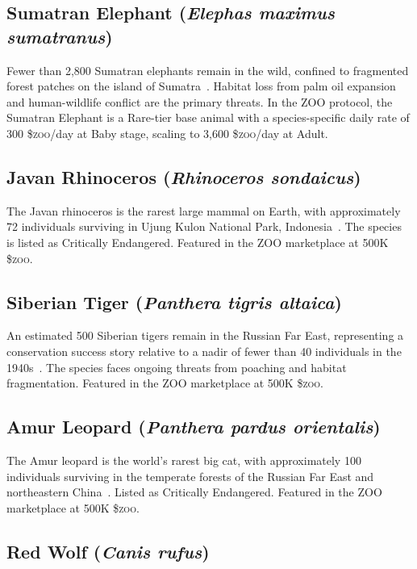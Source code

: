 \documentclass[11pt,letterpaper]{article}
\newcommand{\ZOO}{\$\textsc{zoo}}
\begin{document}
\subsection{Sumatran Elephant (\textit{Elephas maximus sumatranus})}

Fewer than 2,800 Sumatran elephants remain in the wild, confined to fragmented forest
patches on the island of Sumatra~\cite{iucn2021}.  Habitat loss from palm oil expansion
and human-wildlife conflict are the primary threats.  In the ZOO protocol, the Sumatran
Elephant is a Rare-tier base animal with a species-specific daily rate of 300 \ZOO{}/day
at Baby stage, scaling to 3,600 \ZOO{}/day at Adult.

\subsection{Javan Rhinoceros (\textit{Rhinoceros sondaicus})}

The Javan rhinoceros is the rarest large mammal on Earth, with approximately 72 individuals
surviving in Ujung Kulon National Park, Indonesia~\cite{irf2021}.  The species is listed as
Critically Endangered.  Featured in the ZOO marketplace at 500K \ZOO{}.

\subsection{Siberian Tiger (\textit{Panthera tigris altaica})}

An estimated 500 Siberian tigers remain in the Russian Far East, representing a
conservation success story relative to a nadir of fewer than 40 individuals in the
1940s~\cite{panthera2021}.  The species faces ongoing threats from poaching and habitat
fragmentation.  Featured in the ZOO marketplace at 500K \ZOO{}.

\subsection{Amur Leopard (\textit{Panthera pardus orientalis})}

The Amur leopard is the world's rarest big cat, with approximately 100 individuals
surviving in the temperate forests of the Russian Far East and northeastern
China~\cite{panthera2021}.  Listed as Critically Endangered.  Featured in the ZOO
marketplace at 500K \ZOO{}.

\subsection{Red Wolf (\textit{Canis rufus})}
\end{document}
